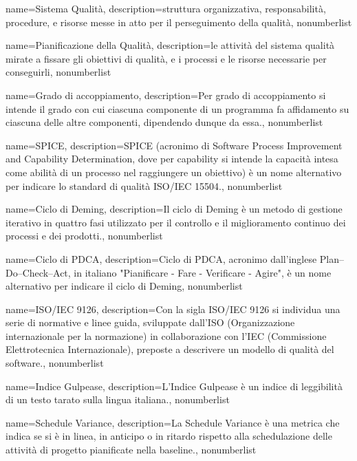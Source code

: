 {
	name={Sistema Qualità},
	description={struttura organizzativa, responsabilità, procedure, e risorse messe in atto per il perseguimento della qualità},
	nonumberlist 
}

{
	name={Pianificazione della Qualità},
	description={le attività del sistema qualità mirate a fissare gli obiettivi di qualità, e i processi e le risorse necessarie per conseguirli},
	nonumberlist 
}

{
	name={Grado di accoppiamento},
	description={Per grado di accoppiamento si intende il grado con cui ciascuna componente di un programma fa affidamento su ciascuna delle altre componenti, dipendendo dunque da essa.},
	nonumberlist 
}

{
	name={SPICE},
	description={SPICE (acronimo di Software Process Improvement and Capability Determination, dove per capability si intende la capacità intesa come abilità di un processo nel raggiungere un obiettivo) è un nome alternativo per indicare lo standard di qualità ISO/IEC 15504.}, 
	nonumberlist 
}

{
	name={Ciclo di Deming},
	description={Il ciclo di Deming è un metodo di gestione iterativo in quattro fasi utilizzato per il controllo e il miglioramento continuo dei processi e dei prodotti.}, 
	nonumberlist 
}

{
	name={Ciclo di PDCA},
	description={Ciclo di PDCA, acronimo dall'inglese Plan–Do–Check–Act, in italiano "Pianificare - Fare - Verificare - Agire", è un nome alternativo per indicare il ciclo di Deming}, 
	nonumberlist 
}

{
	name={ISO/IEC 9126},
	description={Con la sigla ISO/IEC 9126 si individua una serie di normative e linee guida, sviluppate dall'ISO (Organizzazione internazionale per la normazione) in collaborazione con l'IEC (Commissione Elettrotecnica Internazionale), preposte a descrivere un modello di qualità del software.}, 
	nonumberlist 
}

{
	name={Indice Gulpease},
	description={L'Indice Gulpease è un indice di leggibilità di un testo tarato sulla lingua italiana.}, 
	nonumberlist 
}

{
	name={Schedule Variance},
	description={La Schedule Variance è una metrica che indica se si è in linea, in anticipo o in ritardo rispetto alla schedulazione delle attività di progetto pianificate nella baseline.}, 
	nonumberlist 
}

